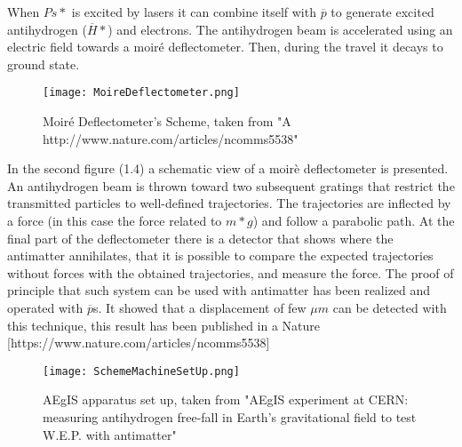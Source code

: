 When $ {Ps*} $ is excited by lasers it can combine itself with $ \overline{p} $ to generate excited antihydrogen ($ \overline{H}* $) and electrons. The antihydrogen beam is accelerated using an electric field towards a moiré deflectometer. Then, during the travel it decays to ground state.  


\begin{figure}[H]
\centering
\texttt{[image: MoireDeflectometer.png]} 
\caption{Moiré Deflectometer's Scheme, taken from "A
http://www.nature.com/articles/ncomms5538" }
\end{figure}

In the second figure (1.4) a schematic view of a moirè deflectometer is presented.
An antihydrogen beam is thrown toward two subsequent gratings that restrict the transmitted particles to well-defined trajectories. The trajectories are inflected by a force (in this case the force related to $ {m*g} $) and follow a parabolic path. At the final part of the deflectometer there is a detector that shows where the antimatter annihilates, that it is possible to compare the expected trajectories without forces with the obtained trajectories, and measure the force. The proof of principle that such system can be used with antimatter has been realized and operated with $ \overline{p} $s. It showed that a displacement of few $ \mu m $ can be detected with this technique, this result has been published in a Nature [https://www.nature.com/articles/ncomms5538]


\begin{figure}[H]
\centering
\texttt{[image: SchemeMachineSetUp.png]} 
\caption{AEgIS apparatus set up, taken from "AEgIS experiment at CERN: measuring antihydrogen free-fall in Earth’s gravitational field to test W.E.P. with antimatter" }
\end{figure}
